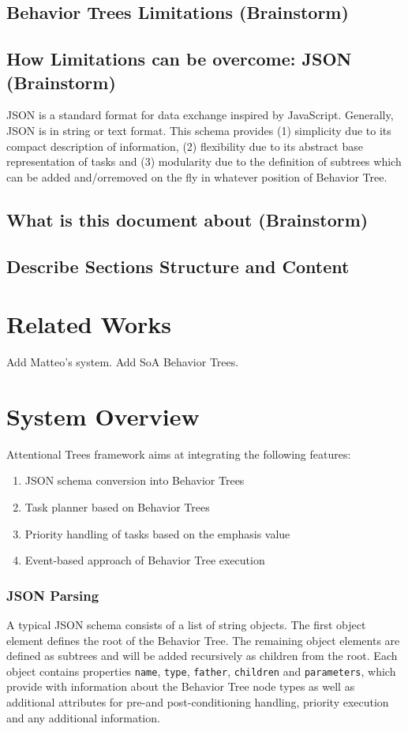 \documentclass[conference]{IEEEtran}
\begin{document}
\subsection{Behavior Trees Limitations (Brainstorm)}
\subsection{How Limitations can be overcome: JSON (Brainstorm)}
JSON is a standard format for data exchange inspired by JavaScript. Generally, JSON is in string or text format.
This schema provides (1) simplicity due to its compact description of information, (2) flexibility due to its abstract base representation of tasks and (3) modularity due to the definition of subtrees which can be added and/orremoved on the fly in whatever position of Behavior Tree.
\subsection{What is this document about (Brainstorm)}
\subsection{Describe Sections Structure and Content}
\section{Related Works}
Add Matteo's system. Add SoA Behavior Trees.


\section{System Overview}
Attentional Trees framework aims at integrating the following features:
\begin{enumerate}
\item JSON schema conversion into Behavior Trees 
\item Task planner based on Behavior Trees
\item Priority handling of tasks based on the emphasis value \cite{b2}
\item Event-based approach of Behavior Tree  execution
\end{enumerate}
\subsubsection*{JSON Parsing}
 A typical JSON schema consists of a list of string objects. The first object element defines the root of the Behavior Tree. The remaining object elements are defined as subtrees and will be added recursively as children from the root. Each object contains properties \verb|name|, \verb|type|, \verb|father|, \verb|children| and \verb|parameters|, which provide with information about the Behavior Tree node types as well as additional attributes for pre-and post-conditioning handling, priority execution and any additional information. 
 
\end{document}
